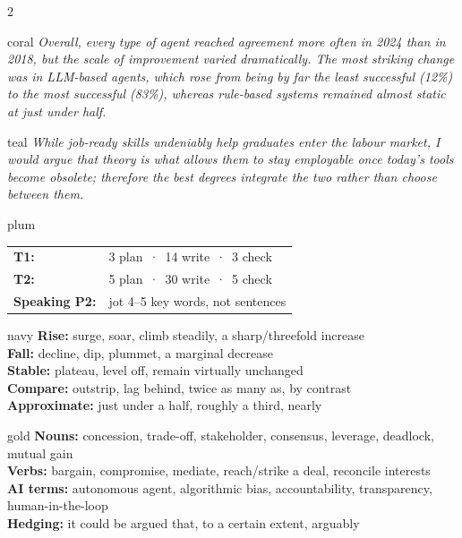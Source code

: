 \documentclass[10pt,a4paper]{article}
\begin{document}
\vspace{1mm}
\begin{multicols}{2}
\begin{tipbox}{coral}
\itshape Overall, every type of agent reached agreement more often in 2024 than in 2018, but the
scale of improvement varied dramatically. The most striking change was in LLM-based agents, which
rose from being by far the least successful (12\%) to the most successful (83\%), whereas
rule-based systems remained almost static at just under half.
\end{tipbox}

\begin{tipbox}{teal}
\itshape While job-ready skills undeniably help graduates enter the labour market, I would argue
that theory is what allows them to stay employable once today's tools become obsolete; therefore
the best degrees integrate the two rather than choose between them.
\end{tipbox}

\begin{tipbox}{plum}
\begin{tabular}{@{}l@{\;}l@{}}
\textbf{T1:} & 3 plan \,·\, 14 write \,·\, 3 check\\
\textbf{T2:} & 5 plan \,·\, 30 write \,·\, 5 check\\
\textbf{Speaking P2:} & jot 4--5 key words, not sentences
\end{tabular}
\end{tipbox}

\columnbreak

\begin{tipbox}{navy}
\textbf{Rise:} surge, soar, climb steadily, a sharp/threefold increase\\
\textbf{Fall:} decline, dip, plummet, a marginal decrease\\
\textbf{Stable:} plateau, level off, remain virtually unchanged\\
\textbf{Compare:} outstrip, lag behind, twice as many as, by contrast\\
\textbf{Approximate:} just under a half, roughly a third, nearly
\end{tipbox}

\begin{tipbox}{gold}
\textbf{Nouns:} concession, trade-off, stakeholder, consensus, leverage, deadlock, mutual gain\\
\textbf{Verbs:} bargain, compromise, mediate, reach/strike a deal, reconcile interests\\
\textbf{AI terms:} autonomous agent, algorithmic bias, accountability, transparency, human-in-the-loop\\
\textbf{Hedging:} it could be argued that, to a certain extent, arguably
\end{tipbox}


\end{multicols}
\end{document}
